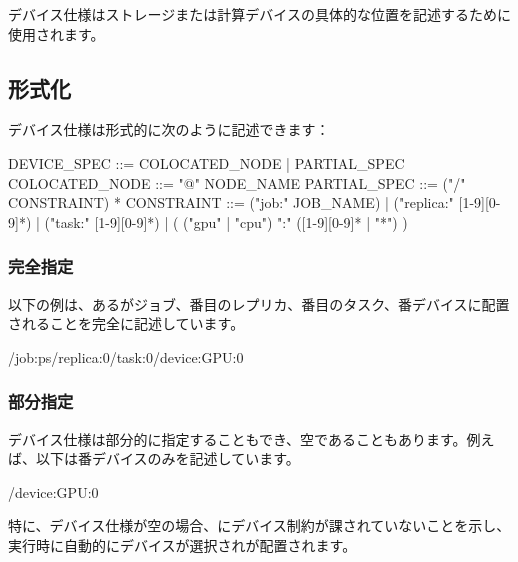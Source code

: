 \begin{content}

デバイス仕様はストレージまたは計算デバイスの具体的な位置を記述するために使用されます。

\subsection{形式化}

デバイス仕様は形式的に次のように記述できます：

\begin{leftbar}
\begin{python}
DEVICE_SPEC ::= COLOCATED_NODE | PARTIAL_SPEC
COLOCATED_NODE ::= "@" NODE_NAME
PARTIAL_SPEC ::= ("/" CONSTRAINT) *
CONSTRAINT ::= ("job:" JOB_NAME)
             | ("replica:" [1-9][0-9]*)
             | ("task:" [1-9][0-9]*)
             | ( ("gpu" | "cpu") ":" ([1-9][0-9]* | "*") )
\end{python}
\end{leftbar}

\subsubsection{完全指定}

以下の例は、あるがジョブ、番目のレプリカ、番目のタスク、番デバイスに配置されることを完全に記述しています。

\begin{leftbar}
\begin{python}
/job:ps/replica:0/task:0/device:GPU:0
\end{python}
\end{leftbar}

\subsubsection{部分指定}

デバイス仕様は部分的に指定することもでき、空であることもあります。例えば、以下は番デバイスのみを記述しています。

\begin{leftbar}
\begin{python}
/device:GPU:0
\end{python}
\end{leftbar}

特に、デバイス仕様が空の場合、にデバイス制約が課されていないことを示し、実行時に自動的にデバイスが選択されが配置されます。


\end{content}
